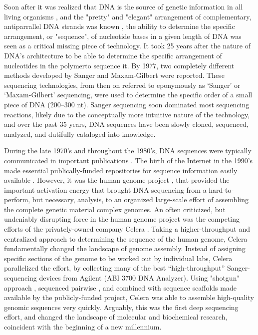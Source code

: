 Soon after it was realized that DNA is the source of genetic information in all living organisms \citep{Watson1953a}, and the "pretty" and "elegant" arrangement of complementary, antiparrallel DNA strands was known \citep{Watson2012a}, the ability to determine the specific arrangement, or "sequence", of nucleotide bases in a given length of DNA was seen as a critical missing piece of technology. It took 25 years after the nature of DNA's architecture to be able to determine the specific arrangement of nucleotides in the polymer\textemdash to sequence it. By 1977, two completely different methods developed by Sanger \citep{Sanger1975a,Sanger1977b} and Maxam-Gilbert \citep{Maxam1977a} were reported. These sequencing technologies, from then on referred to eponymously as ‘Sanger’ or ‘Maxam-Gilbert’ sequencing, were used to determine the specific order of a small piece of DNA (200–300 nt). Sanger sequencing soon dominated most sequencing reactions, likely due to the conceptually more intuitive nature of the technology, and over the past 35 years, DNA sequences have been slowly cloned, sequenced, analyzed, and dutifully cataloged into knowledge.

During the late 1970’s and throughout the 1980’s, DNA sequences were typically communicated in important publications \citep{Cordell1980a,Sanger1978a}. The birth of the Internet in the 1990’s made essential publically-funded repositories for sequence information easily available \citep{Benson2011a}. However, it was the human genome project \citep{Lander2011a,Venter2001}, that provided the important activation energy that brought DNA sequencing from a hard-to-perform, but necessary, analysis, to an organized large-scale effort of assembling the complete genetic material complex genomes. An often criticized, but undeniably disrupting force in the human genome project was the competing efforts of the privately-owned company Celera \citep{Venter2008a}. Taking a higher-throughput and centralized approach to determining the sequence of the human genome, Celera fundamentally changed the landscape of genome assembly. Instead of assigning specific sections of the genome to be worked out by individual labs, Celera parallelized the effort, by collecting many of the best “high-throughput” Sanger-sequencing devices from Agilent (ABI 3700 DNA Analyzer). Using "shotgun" approach \citep{Staden1979}, sequenced pairwise \citep{Roach1995}, and combined with sequence scaffolds made available by the publicly-funded project, Celera was able to assemble high-quality genomic sequences very quickly. Arguably, this was the first deep sequencing effort, and changed the landscape of molecular and biochemical research, coincident with the beginning of a new millennium.

